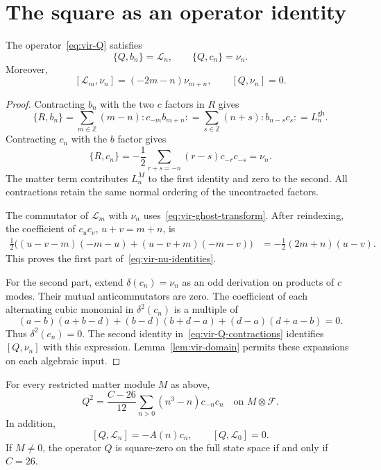 \section{The square as an operator identity}

\begin{lemma}\label{lem:vir-Q-contractions}
The operator~\eqref{eq:vir-Q} satisfies
\begin{equation}\label{eq:vir-Q-contractions}
 \{Q,b_n\}=\mathcal L_n,\qquad \{Q,c_n\}=\nu_n.
\end{equation}
Moreover,
\begin{equation}\label{eq:vir-nu-identities}
 [\mathcal L_m,\nu_n]=(-2m-n)\nu_{m+n},\qquad
 [Q,\nu_n]=0.
\end{equation}
\end{lemma}

\begin{proof}
Contracting $b_n$ with the two $c$ factors in $R$ gives
\[
 \{R,b_n\}=\sum_{m\in\mathbb Z}(m-n):c_{-m}b_{m+n}:
 =\sum_{s\in\mathbb Z}(n+s):b_{n-s}c_s:
 =L_n^{\mathrm{gh}}.
\]
Contracting $c_n$ with the $b$ factor gives
\[
 \{R,c_n\}=-\frac12\sum_{r+s=-n}(r-s)c_{-r}c_{-s}=\nu_n.
\]
The matter term contributes $L_n^M$ to the first identity and zero to the second.
All contractions retain the same normal ordering of the uncontracted factors.

The commutator of $\mathcal L_m$ with $\nu_n$ uses~\eqref{eq:vir-ghost-transform}.
After reindexing, the coefficient of $c_uc_v$, $u+v=m+n$, is
\begin{align*}
 \frac12\bigl((u-v-m)(-m-u)+(u-v+m)(-m-v)\bigr)
 &=-\frac12(2m+n)(u-v).
\end{align*}
This proves the first part of~\eqref{eq:vir-nu-identities}.

For the second part, extend $\delta(c_n)=\nu_n$ as an odd derivation on products of $c$ modes.
Their mutual anticommutators are zero.
The coefficient of each alternating cubic monomial in $\delta^2(c_n)$ is a multiple of
\[
 (a-b)(a+b-d)+(b-d)(b+d-a)+(d-a)(d+a-b)=0.
\]
Thus $\delta^2(c_n)=0$.
The second identity in~\eqref{eq:vir-Q-contractions} identifies $[Q,\nu_n]$ with this expression.
Lemma~\ref{lem:vir-domain} permits these expansions on each algebraic input.
\end{proof}

\begin{theorem}\label{thm:vir-square}
For every restricted matter module $M$ as above,
\begin{equation}\label{eq:vir-square}
 \boxed{\displaystyle
 Q^2=\frac{C-26}{12}\sum_{n>0}(n^3-n)c_{-n}c_n
 \quad\text{on }M\otimes\mathcal F.}
\end{equation}
In addition,
\begin{equation}\label{eq:vir-Q-L}
 [Q,\mathcal L_n]=-A(n)c_n,\qquad [Q,\mathcal L_0]=0.
\end{equation}
If $M\neq0$, the operator $Q$ is square-zero on the full state space if and only if $C=26$.
\end{theorem}

